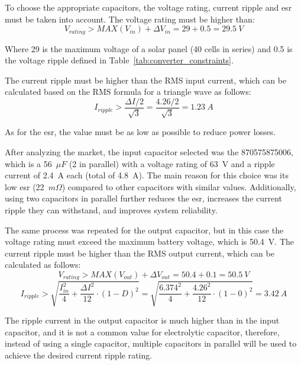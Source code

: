     To choose the appropriate capacitors, the voltage rating, current ripple and \ac{esr} must be taken into account. The voltage rating must be higher than:
    \begin{equation}
        V_{rating} > MAX(V_{in}) + \Delta V_{in} = 29 + 0.5 = 29.5~V
    \end{equation}

    Where 29 is the maximum voltage of a solar panel (40 cells in series) and 0.5 is the voltage ripple defined in Table~\ref{tab:converter_constraints}.

    The current ripple must be higher than the RMS input current, which can be calculated based on the RMS formula for a triangle wave as follows:
    \begin{equation}
        I_{ripple} > \frac{\Delta I / 2}{\sqrt{3}} = \frac{4.26 / 2}{\sqrt{3}} = 1.23~A
    \end{equation}

    As for the \ac{esr}, the value must be as low as possible to reduce power losses. 

    After analyzing the market, the input capacitor selected was the 870575875006, which is a 56~$\mu F$ (2 in parallel) with a voltage rating of 63~V and a ripple current of 2.4~A each (total of 4.8~A). The main reason for this choice was its low \ac{esr} (22~$m\Omega$) compared to other capacitors with similar values. Additionally, using two capacitors in parallel further reduces the \ac{esr}, increases the current ripple they can withstand, and improves system reliability.

    The same process was repeated for the output capacitor, but in this case the voltage rating must exceed the maximum battery voltage, which is 50.4~V. The current ripple must be higher than the RMS output current, which can be calculated as follows:
    \begin{equation}
        V_{rating} > MAX(V_{out}) + \Delta V_{out} = 50.4 + 0.1 = 50.5~V
    \end{equation}
    \begin{equation}
        I_{ripple} > \sqrt{\frac{I_{in}^2}{4} + \frac{\Delta I ^2}{12} \cdot (1-D)^2} = \sqrt{\frac{6.374^2}{4} + \frac{4.26 ^2}{12} \cdot (1-0)^2} = 3.42~A
    \end{equation}

    The ripple current in the output capacitor is much higher than in the input capacitor, and it is not a common value for electrolytic capacitor, therefore, instead of using a single capacitor, multiple capacitors in parallel will be used to achieve the desired current ripple rating.

